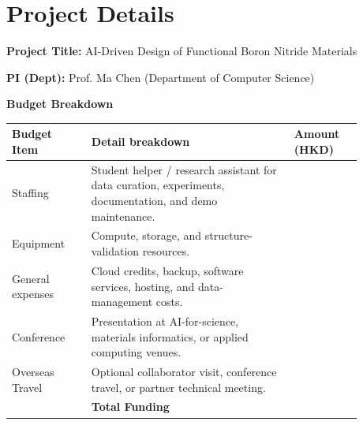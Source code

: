 \documentclass[10pt]{article}
\newcommand{\blank}[1][8em]{\colorbox{yellow!35}{\rule{0pt}{1.1em}\hspace{#1}}}
\begin{document}
\section*{Project Details}
\textbf{Project Title:} AI-Driven Design of Functional Boron Nitride Materials

\textbf{PI (Dept):} Prof. Ma Chen (Department of Computer Science)

\textbf{Budget Breakdown}
\begin{center}
\small
\begin{tabular}{p{0.20\linewidth}p{0.51\linewidth}p{0.17\linewidth}}
\toprule
\textbf{Budget Item} & \textbf{Detail breakdown} & \textbf{Amount (HKD)} \\
\midrule
Staffing & Student helper / research assistant for data curation, experiments, documentation, and demo maintenance. & \blank \\
Equipment & Compute, storage, and structure-validation resources. & \blank \\
General expenses & Cloud credits, backup, software services, hosting, and data-management costs. & \blank \\
Conference & Presentation at AI-for-science, materials informatics, or applied computing venues. & \blank \\
Overseas Travel & Optional collaborator visit, conference travel, or partner technical meeting. & \blank \\
\midrule
 & \textbf{Total Funding} & \blank \\
\bottomrule
\end{tabular}
\end{center}
\end{document}

